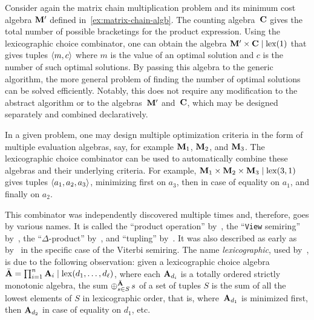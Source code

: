 \begin{example}
    Consider again the matrix chain multiplication problem and its minimum cost algebra \(\mathbf{M}'\) defined in~\cref{ex:matrix-chain-algb}.
    The counting algebra~\(\mathbf{C}\) gives the total number of possible bracketings for the product expression.
    Using the lexicographic choice combinator, one can obtain the algebra \(\mathbf{M}' \times \mathbf{C} \mid \mathrm{lex}(1)\) that gives tuples \(\left\langle m, c\right\rangle\) where \(m\) is the value of an optimal solution and \(c\) is the number of such optimal solutions.
    By passing this algebra to the generic algorithm, the more general problem of finding the number of optimal solutions can be solved efficiently.
    Notably, this does not require any modification to the abstract algorithm or to the algebras~\(\mathbf{M}'\) and~\(\mathbf{C}\), which may be designed separately and combined declaratively.
\end{example}

\begin{example}
    In a given problem, one may design multiple optimization criteria in the form of multiple evaluation algebras, say, for example \(\mathbf{M}_1\), \(\mathbf{M}_2\), and \(\mathbf{M}_3\).
    The lexicographic choice combinator can be used to automatically combine these algebras and their underlying criteria.
    For example, \(\mathbf{M}_1 \times \mathbf{M}_2 \times \mathbf{M}_3 \mid \mathrm{lex}(3, 1)\) gives tuples \(\left\langle a_1, a_2, a_3\right\rangle\), minimizing first on \(a_3\), then in case of equality on \(a_1\), and finally on \(a_2\).
\end{example}

This combinator was independently discovered multiple times and, therefore, goes by various names.
It is called
the \enquote{product operation} by~\textcite{Steffen2005VersatileDeclarativeDynamic},
the \enquote{\texttt{View} semiring} by~\textcite{Erwig2021ExplainableDynamicProgramming},
the \enquote{\(\Delta\)-product} by~\textcite{Baril2026NewPerspectivesSemiring},
and \enquote{tupling} by~\textcite{Little2024PolymorphicDynamicProgramming}.
It was also described as early as~\citeyear{Goodman1999SemiringParsing} by~\textcite{Goodman1999SemiringParsing} in the specific case of the Viterbi semiring.
The name \emph{lexicographic}, used by~\textcite{Volgenant2002SolvingLexicographicMultiobjective,Saule2015ParetoOptimizationAlgebraic}, is due to the following observation:
given a lexicographic choice algebra \(\bar{\mathbf{A}} = \prod_{i=1}^n \mathbf{A}_i \mid \mathrm{lex}(d_1, \ldots, d_\ell)\), where each \(\mathbf{A}_{d_i}\) is a totally ordered strictly monotonic algebra, the sum \(\mathbin{\oplus}^{\bar{\mathbf{A}}}_{s \in S}{\,s}\) of a set of tuples \(S\) is the sum of all the lowest elements of \(S\) in lexicographic order, that is, where~\(\mathbf{A}_{d_1}\) is minimized first, then \(\mathbf{A}_{d_2}\) in case of equality on \(d_1\), etc.

